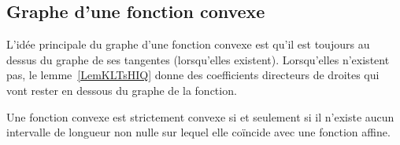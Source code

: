 \subsection{Graphe d'une fonction convexe}

L'idée principale du graphe d'une fonction convexe est qu'il est toujours au dessus du graphe de ses tangentes (lorsqu'elles existent). Lorsqu'elles n'existent pas, le lemme~\ref{LemKLTsHIQ} donne des coefficients directeurs de droites qui vont rester en dessous du graphe de la fonction.

\begin{proposition}      \label{PROPooOCOEooEGybmS}
    Une fonction convexe est strictement convexe si et seulement si il n'existe aucun intervalle de longueur non nulle sur lequel elle coïncide avec une fonction affine.
\end{proposition}

